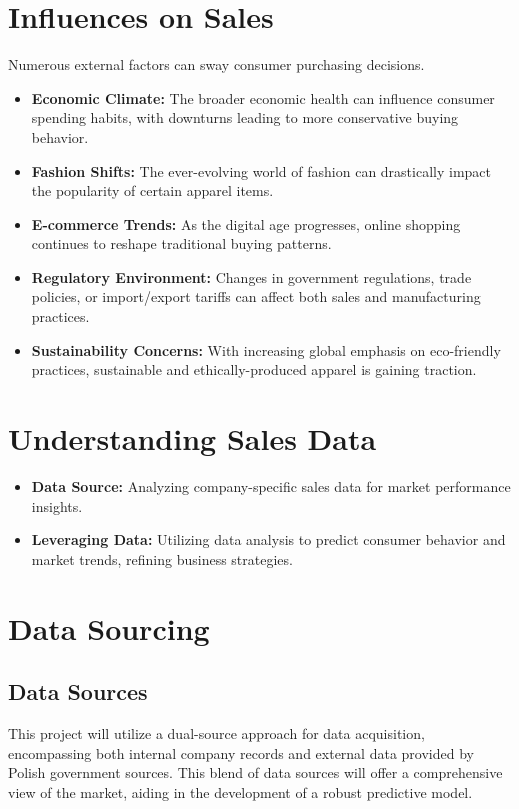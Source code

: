 \documentclass{article}
\begin{document}
\section{Influences on Sales}
Numerous external factors can sway consumer purchasing decisions.
\begin{itemize}
    \item \textbf{Economic Climate:} The broader economic health can influence consumer spending habits, with downturns leading to more conservative buying behavior.
    \item \textbf{Fashion Shifts:} The ever-evolving world of fashion can drastically impact the popularity of certain apparel items.
    \item \textbf{E-commerce Trends:} As the digital age progresses, online shopping continues to reshape traditional buying patterns.
    \item \textbf{Regulatory Environment:} Changes in government regulations, trade policies, or import/export tariffs can affect both sales and manufacturing practices.
    \item \textbf{Sustainability Concerns:} With increasing global emphasis on eco-friendly practices, sustainable and ethically-produced apparel is gaining traction.
\end{itemize}

\section{Understanding Sales Data}
\begin{itemize}
    \item \textbf{Data Source:} Analyzing company-specific sales data for market performance insights.
    \item \textbf{Leveraging Data:} Utilizing data analysis to predict consumer behavior and market trends, refining business strategies.
\end{itemize}



\section{Data Sourcing}

\subsection{Data Sources}
This project will utilize a dual-source approach for data acquisition, encompassing both internal company records and external data provided by Polish government sources. This blend of data sources will offer a comprehensive view of the market, aiding in the development of a robust predictive model.
\end{document}
